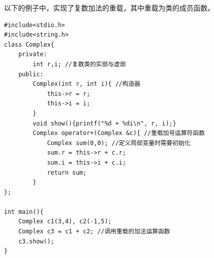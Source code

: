 \documentclass[UTF8]{ctexart}
\begin{document}
以下的例子中，实现了复数加法的重载，其中重载为类的成员函数。
\begin{lstlisting}
#include<stdio.h>
#include<string.h>
class Complex{
	private:
		int r,i; //复数类的实部与虚部
	public:
		Complex(int r, int i){ //构造器
			this->r = r;
			this->i = i;
		}
		void show(){printf("%d + %di\n", r, i);}
		Complex operator+(Complex &c){ //重载加号运算符函数
			Complex sum(0,0); //定义局部变量时需要初始化
			sum.r = this->r + c.r;
			sum.i = this->i + c.i;
			return sum;
		}
};

int main(){
	Complex c1(3,4), c2(-1,5);
	Complex c3 = c1 + c2; //调用重载的加法运算函数
	c3.show();
}
\end{lstlisting}

\BgThispage
\end{document}
